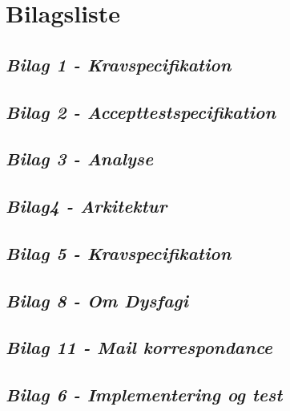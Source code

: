 \chapter{Bilagsliste}
\section{\textit{Bilag 1 - Kravspecifikation}} \label{bilag1}
\section{\textit{Bilag 2 - Accepttestspecifikation}} \label{bilag2}
\section{\textit{Bilag 3 - Analyse}} \label{bilag3}
\section{\textit{Bilag4 - Arkitektur}} \label{bilag4}
\section{\textit{Bilag 5 - Kravspecifikation}} \label{bilag5}
\section{\textit{Bilag 8 - Om Dysfagi}} \label{bilag8}
\section{\textit{Bilag 11 - Mail korrespondance}} \label{bilag11}
\section{\textit{Bilag 6 - Implementering og test}} \label{bilag6}


